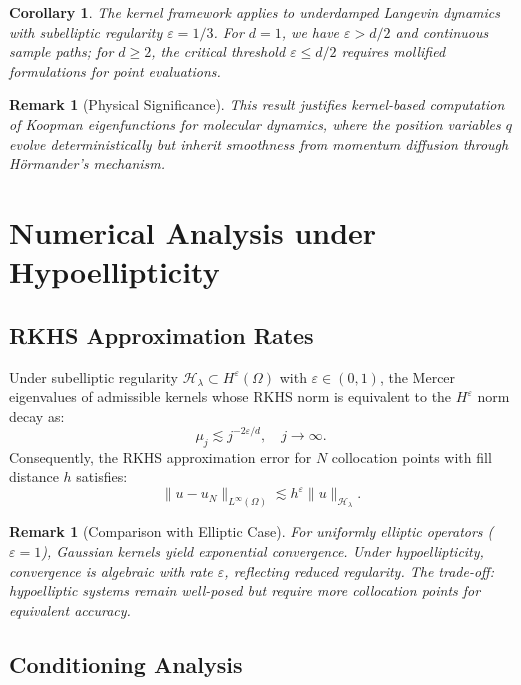 \documentclass[11pt,a4paper]{article}
\newtheorem{corollary}[theorem]{Corollary}
\newtheorem{remark}[theorem]{Remark}
\begin{document}
\begin{corollary}
The kernel framework applies to underdamped Langevin dynamics with subelliptic regularity $\varepsilon = 1/3$. For $d = 1$, we have $\varepsilon > d/2$ and continuous sample paths; for $d \geq 2$, the critical threshold $\varepsilon \leq d/2$ requires mollified formulations for point evaluations.
\end{corollary}

\begin{remark}[Physical Significance]
This result justifies kernel-based computation of Koopman eigenfunctions for molecular dynamics, where the position variables $q$ evolve deterministically but inherit smoothness from momentum diffusion through H\"{o}rmander's mechanism.
\end{remark}

\section{Numerical Analysis under Hypoellipticity}

\subsection{RKHS Approximation Rates}

Under subelliptic regularity $\mathcal{H}_\lambda \subset H^\varepsilon(\Omega)$ with $\varepsilon \in (0,1)$, the Mercer eigenvalues of admissible kernels whose RKHS norm is equivalent to the $H^\varepsilon$ norm decay as:
\[
\mu_j \lesssim j^{-2\varepsilon/d}, \quad j \to \infty.
\]
Consequently, the RKHS approximation error for $N$ collocation points with fill distance $h$ satisfies:
\[
\|u - u_N\|_{L^\infty(\Omega)} \lesssim h^\varepsilon \|u\|_{\mathcal{H}_\lambda}.
\]

\begin{remark}[Comparison with Elliptic Case]
For uniformly elliptic operators ($\varepsilon = 1$), Gaussian kernels yield exponential convergence. Under hypoellipticity, convergence is algebraic with rate $\varepsilon$, reflecting reduced regularity. The trade-off: hypoelliptic systems remain well-posed but require more collocation points for equivalent accuracy.
\end{remark}

\subsection{Conditioning Analysis}
\end{document}
